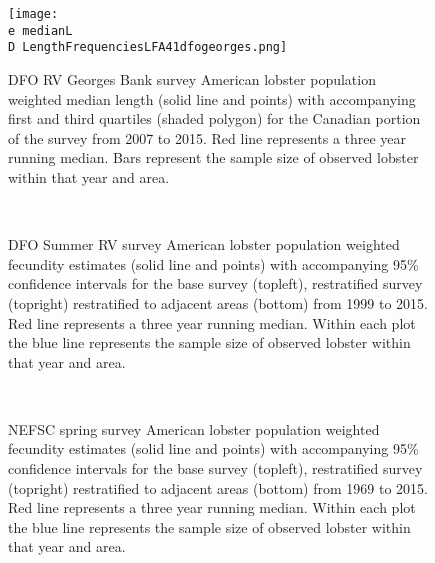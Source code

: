 \documentclass[11pt]{article}
\newcommand{\D}{.}
\newcommand{\e}{/backup/bio_data/bio.lobster/figures/} %
\begin{document}
\begin{figure}

    \texttt{[image: \\e medianL\\D LengthFrequenciesLFA41dfogeorges.png]}
    \caption{DFO RV Georges Bank survey American lobster population weighted median length (solid line and points) with accompanying first and third quartiles (shaded polygon) for the Canadian portion of the survey from 2007 to 2015. Red line represents a three year running median. Bars represent the sample size of observed lobster within that year and area.}

\end{figure}






\begin{figure}
\centering
{}
\\
\caption{DFO Summer RV survey American lobster population weighted fecundity estimates (solid line and points) with accompanying 95\% confidence intervals for the base survey (topleft), restratified survey (topright) restratified to adjacent areas (bottom) from 1999 to 2015. Red line represents a three year running median. Within each plot the blue line represents the sample size of observed lobster within that year and area.}
\end{figure}
\clearpage


\begin{figure}
\centering
{}
\\
\caption{NEFSC spring survey American lobster population weighted fecundity estimates (solid line and points) with accompanying 95\% confidence intervals for the base survey (topleft), restratified survey (topright) restratified to adjacent areas (bottom) from 1969 to 2015. Red line represents a three year running median. Within each plot the blue line represents the sample size of observed lobster within that year and area. }
\end{figure}
\clearpage
\end{document}
